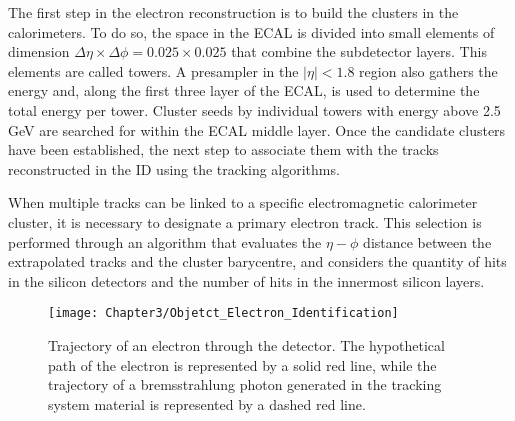 The first step in the electron reconstruction is to build the clusters in the calorimeters.
To do so, the space in the ECAL is divided into small elements of dimension 
$\Delta \eta \times \Delta \phi =  0.025 \times 0.025$ that combine the subdetector layers. 
This elements are called towers. A presampler in the $|\eta|<1.8$ region also gathers the energy
and, along the first three layer of the ECAL, is used to determine the total energy per tower.
Cluster seeds by individual towers with energy above 2.5$\,$GeV are
searched for within the ECAL middle layer. Once the candidate clusters have been established,
the next step to associate them with the tracks reconstructed in the ID using the tracking algorithms.

When multiple tracks can be linked to a specific electromagnetic calorimeter cluster, 
it is necessary to designate a primary electron track. This selection is performed 
through an algorithm that evaluates the $\eta-\phi$ distance between the extrapolated 
tracks and the cluster barycentre,  and considers the quantity of hits in the silicon 
detectors and the number of hits in the innermost silicon layers.
	
\begin{figure}
	\centering
 	\texttt{[image: Chapter3/Objetct\_Electron\_Identification]}
  	\caption{Trajectory of an electron through the detector. 
	The hypothetical path of the electron is represented by a solid red line, while the trajectory of a
	bremsstrahlung photon generated in the tracking system material is represented by a dashed red line.}
	 \label{fig:ChapReco:ElectronPath}
\end{figure}

